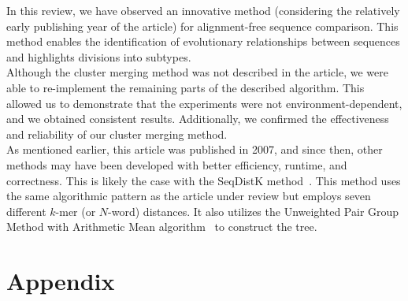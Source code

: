 \documentclass[english,13pt,a4paper]{article}
\theoremstyle{definition}
\theoremstyle{remark}
\theoremstyle{defstyle}
\begin{document}
In this review, we have observed an innovative method (considering the relatively early publishing year of the article) for alignment-free sequence comparison. This method enables the identification of evolutionary relationships between sequences and highlights divisions into subtypes.\\

Although the cluster merging method was not described in the article, we were able to re-implement the remaining parts of the described algorithm. This allowed us to demonstrate that the experiments were not environment-dependent, and we obtained consistent results. Additionally, we confirmed the effectiveness and reliability of our cluster merging method.\\

As mentioned earlier, this article was published in 2007, and since then, other methods may have been developed with better efficiency, runtime, and correctness. This is likely the case with the SeqDistK method~\cite{Liu2021seqdistk}. This method uses the same algorithmic pattern as the article under review but employs seven different $k$-mer (or $N$-word) distances. It also utilizes the Unweighted Pair Group Method with Arithmetic Mean algorithm~\cite{sokal1975statistical} to construct the tree.


\vfill

\printbibliography

\newpage
{}
\section*{Appendix}
\end{document}
